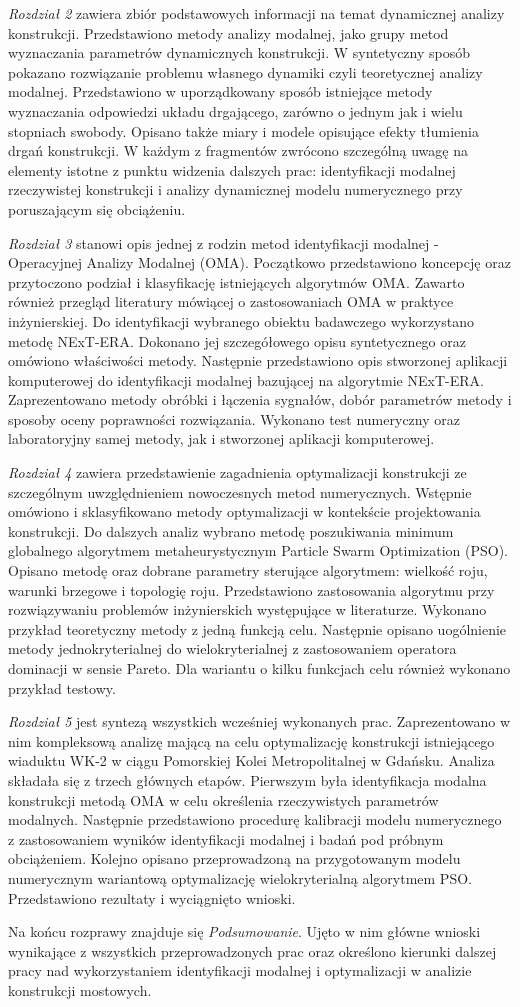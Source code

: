 \textit{Rozdział 2} zawiera zbiór podstawowych informacji na temat dynamicznej analizy konstrukcji. Przedstawiono metody analizy modalnej, jako grupy metod wyznaczania parametrów dynamicznych konstrukcji. W syntetyczny sposób pokazano rozwiązanie problemu własnego dynamiki czyli teoretycznej analizy modalnej. Przedstawiono w uporządkowany sposób istniejące metody wyznaczania odpowiedzi układu drgającego, zarówno o jednym jak i wielu stopniach swobody. Opisano także miary i modele opisujące efekty tłumienia drgań konstrukcji. W każdym z fragmentów zwrócono szczególną uwagę na elementy istotne z punktu widzenia dalszych prac: identyfikacji modalnej rzeczywistej konstrukcji i analizy dynamicznej modelu numerycznego przy poruszającym się obciążeniu.

\textit{Rozdział 3} stanowi opis jednej z rodzin metod identyfikacji modalnej - Operacyjnej Analizy Modalnej (OMA). Początkowo przedstawiono koncepcję oraz przytoczono podział i klasyfikację istniejących algorytmów OMA. Zawarto również przegląd literatury mówiącej o zastosowaniach OMA w praktyce inżynierskiej. Do identyfikacji wybranego obiektu badawczego wykorzystano metodę NExT-ERA. Dokonano jej szczegółowego opisu syntetycznego oraz omówiono właściwości metody. Następnie przedstawiono opis stworzonej aplikacji komputerowej do identyfikacji modalnej bazującej na algorytmie NExT-ERA. Zaprezentowano metody obróbki i łączenia sygnałów, dobór parametrów metody i sposoby oceny poprawności rozwiązania. Wykonano test numeryczny oraz laboratoryjny samej metody, jak i stworzonej aplikacji komputerowej.

\textit{Rozdział 4} zawiera przedstawienie zagadnienia optymalizacji konstrukcji ze szczególnym uwzględnieniem nowoczesnych metod numerycznych. Wstępnie omówiono i sklasyfikowano metody optymalizacji w kontekście projektowania konstrukcji. Do dalszych analiz wybrano metodę poszukiwania minimum globalnego algorytmem metaheurystycznym Particle Swarm Optimization (PSO). Opisano metodę oraz dobrane parametry sterujące algorytmem: wielkość roju, warunki brzegowe i topologię roju. Przedstawiono zastosowania algorytmu przy rozwiązywaniu problemów inżynierskich występujące w literaturze. Wykonano przykład teoretyczny metody z jedną funkcją celu. Następnie opisano uogólnienie metody jednokryterialnej do wielokryterialnej z zastosowaniem operatora dominacji w sensie Pareto. Dla wariantu o kilku funkcjach celu również wykonano przykład testowy.

\textit{Rozdział 5} jest syntezą wszystkich wcześniej wykonanych prac. Zaprezentowano w nim kompleksową analizę mającą na celu optymalizację konstrukcji istniejącego wiaduktu WK-2 w ciągu Pomorskiej Kolei Metropolitalnej w Gdańsku. Analiza składała się z trzech głównych etapów. Pierwszym była identyfikacja modalna konstrukcji metodą OMA w celu określenia rzeczywistych parametrów modalnych. Następnie przedstawiono procedurę kalibracji modelu numerycznego z zastosowaniem wyników identyfikacji modalnej i badań pod próbnym obciążeniem. Kolejno opisano przeprowadzoną na przygotowanym modelu numerycznym wariantową optymalizację wielokryterialną algorytmem PSO. Przedstawiono rezultaty i wyciągnięto wnioski.

Na końcu rozprawy znajduje się \textit{Podsumowanie}. Ujęto w nim główne wnioski wynikające z wszystkich przeprowadzonych prac oraz określono kierunki dalszej pracy nad wykorzystaniem identyfikacji modalnej i optymalizacji w analizie konstrukcji mostowych.






